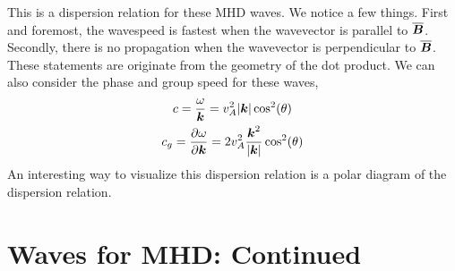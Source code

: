 \documentclass{article}
\begin{document}
This is a dispersion relation for these MHD waves. We notice a few things. First
and foremost, the wavespeed is fastest when the wavevector is parallel to
$\overline{\boldsymbol{B}}$. Secondly, there is no propagation when the wavevector is
perpendicular to $\overline{\boldsymbol{B}}$. These statements are originate from the
geometry of the dot product. We can also consider the phase and group speed for
these waves,
\begin{gather*}
    c = \frac{\omega}{\boldsymbol{k}} = v_A^2|\boldsymbol{k}|\cos^2(\theta)\\
    c_g = \frac{\partial \omega}{\partial \boldsymbol{k}} = 2 v_A^2 \frac{\boldsymbol{k}^2}{|\boldsymbol{k}|}\cos^2(\theta)
\end{gather*}
An interesting way to visualize this dispersion relation is a polar diagram of
the dispersion relation. 


\section{Waves for MHD: Continued}
\end{document}
